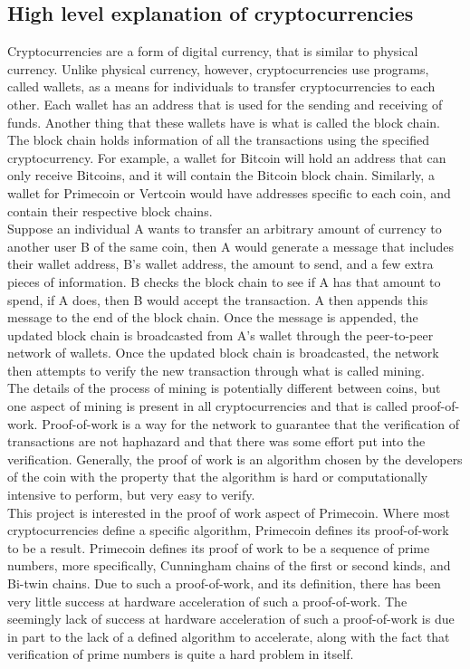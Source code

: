 \documentclass[journal]{IEEEtran}
\begin{document}
\subsection{High level explanation of cryptocurrencies}
Cryptocurrencies are a form of digital currency, that is similar to physical currency. Unlike physical currency, however, cryptocurrencies use programs, called wallets, as a means for individuals to transfer cryptocurrencies to each other. Each wallet has an address that is used for the sending and receiving of funds. Another thing that these wallets have is what is called the block chain. The block chain holds information of all the transactions using the specified cryptocurrency. For example, a wallet for Bitcoin will hold an address that can only receive Bitcoins, and it will contain the Bitcoin block chain. Similarly, a wallet for Primecoin or Vertcoin would have addresses specific to each coin, and contain their respective block chains.\\

Suppose an individual A wants to transfer an arbitrary amount of currency to another user B of the same coin, then A would generate a message that includes their wallet address, B's wallet address, the amount to send, and a few extra pieces of information. B checks the block chain to see if A has that amount to spend, if A does, then B would accept the transaction. A then appends this message to the end of the block chain. Once the message is appended, the updated block chain is broadcasted from A's wallet through the peer-to-peer network of wallets. Once the updated block chain is broadcasted, the network then attempts to verify the new transaction through what is called mining.\\

The details of the process of mining is potentially different between coins, but one aspect of mining is present in all cryptocurrencies and that is called proof-of-work. Proof-of-work is a way for the network to guarantee that the verification of transactions are not haphazard and that there was some effort put into the verification. Generally, the proof of work is an algorithm chosen by the developers of the coin with the property that the algorithm is hard or computationally intensive to perform, but very easy to verify.\\

This project is interested in the proof of work aspect of Primecoin. Where most cryptocurrencies define a specific algorithm, Primecoin defines its proof-of-work to be a result. Primecoin defines its proof of work to be a sequence of prime numbers, more specifically, Cunningham chains of the first or second kinds, and Bi-twin chains.\cite{primecoin} Due to such a proof-of-work, and its definition, there has been very little success at hardware acceleration of such a proof-of-work. The seemingly lack of success at hardware acceleration of such a proof-of-work is due in part to the lack of a defined algorithm to accelerate, along with the fact that verification of prime numbers is quite a hard problem in itself.\\
\end{document}
